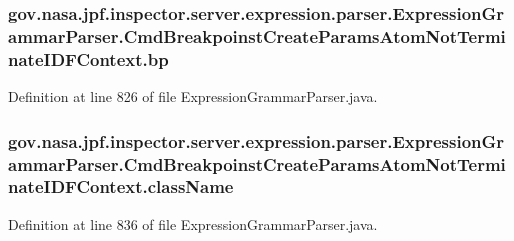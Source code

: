 \subsubsection[{\texorpdfstring{bp}{bp}}]{ gov.\+nasa.\+jpf.\+inspector.\+server.\+expression.\+parser.\+Expression\+Grammar\+Parser.\+Cmd\+Breakpoinst\+Create\+Params\+Atom\+Not\+Terminate\+I\+D\+F\+Context.\+bp}\hypertarget{classgov_1_1nasa_1_1jpf_1_1inspector_1_1server_1_1expression_1_1parser_1_1_expression_grammar_paee196826319d0ea00470866a7ffd8d7b_a9644352d25e21dfe2560cb2f8f86f96c}{}\label{classgov_1_1nasa_1_1jpf_1_1inspector_1_1server_1_1expression_1_1parser_1_1_expression_grammar_paee196826319d0ea00470866a7ffd8d7b_a9644352d25e21dfe2560cb2f8f86f96c}


Definition at line 826 of file Expression\+Grammar\+Parser.\+java.

\subsubsection[{\texorpdfstring{class\+Name}{className}}]{ gov.\+nasa.\+jpf.\+inspector.\+server.\+expression.\+parser.\+Expression\+Grammar\+Parser.\+Cmd\+Breakpoinst\+Create\+Params\+Atom\+Not\+Terminate\+I\+D\+F\+Context.\+class\+Name}\hypertarget{classgov_1_1nasa_1_1jpf_1_1inspector_1_1server_1_1expression_1_1parser_1_1_expression_grammar_paee196826319d0ea00470866a7ffd8d7b_a0647e22fd6598a0bf7fabe1351ad76f4}{}\label{classgov_1_1nasa_1_1jpf_1_1inspector_1_1server_1_1expression_1_1parser_1_1_expression_grammar_paee196826319d0ea00470866a7ffd8d7b_a0647e22fd6598a0bf7fabe1351ad76f4}


Definition at line 836 of file Expression\+Grammar\+Parser.\+java.

